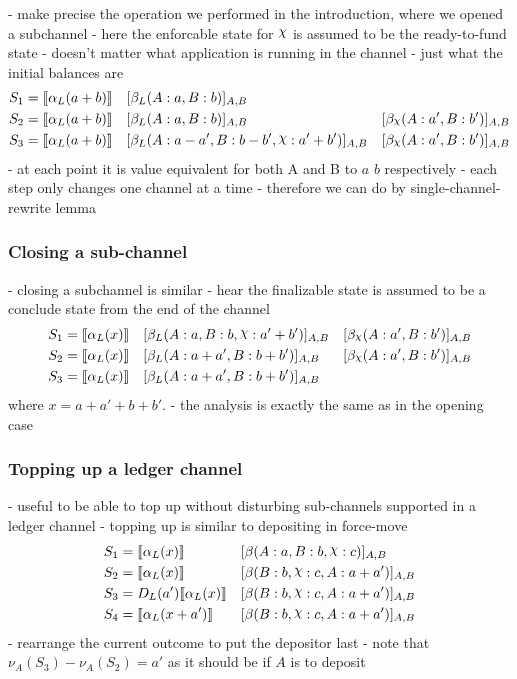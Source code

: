 \documentclass{article}
\DeclareRobustCommand{\rchi}{{\mathpalette\irchi\relax}}
\newcommand{\irchi}[2]{\raisebox{\depth}{$#1\chi$}} %
\theoremstyle{definition}
\newcommand{\adj}[1]{\llbracket #1 \rrbracket}
\newcommand{\enf}[1]{[#1]}
\begin{document}
- make precise the operation we performed in the introduction, where we opened a subchannel
- here the enforcable state for $\rchi$ is assumed to be the ready-to-fund state
- doesn't matter what application is running in the channel - just what the initial balances are
\begin{align*}
  S_1 &= \adj{\alpha_L(a+b)} &&\enf{\beta_L(A: a, B: b)}_{A, B} & \\
  S_2 &= \adj{\alpha_L(a+b)} &&\enf{\beta_L(A: a, B: b)}_{A, B}&\enf{\beta_\rchi(A: a', B: b')}_{A, B} \\
  S_3 &= \adj{\alpha_L(a+b)} &&\enf{\beta_L(A: a-a', B: b-b', \rchi: a' + b')}_{A, B}&\enf{\beta_\rchi(A: a', B: b')}_{A, B}
\end{align*}
- at each point it is value equivalent for both A and B to $a$ $b$ respectively
- each step only changes one channel at a time 
- therefore we can do by single-channel-rewrite lemma

\subsubsection{Closing a sub-channel}

- closing a subchannel is similar
- hear the finalizable state is assumed to be a conclude state from the end of the channel
\begin{align*}
S_1 &= \adj{\alpha_L(x)} &&\enf{\beta_L(A: a, B: b, \rchi: a' + b')}_{A, B}&\enf{\beta_\rchi(A: a', B: b')}_{A, B}\\
S_2 &= \adj{\alpha_L(x)} &&\enf{\beta_L(A: a + a', B: b + b')}_{A, B}&\enf{\beta_\rchi(A: a', B: b')}_{A, B} \\
S_3 &= \adj{\alpha_L(x)} &&\enf{\beta_L(A: a + a', B: b + b')}_{A, B} & 
\end{align*}
where $x = a + a' + b + b'$.
- the analysis is exactly the same as in the opening case

\subsubsection{Topping up a ledger channel}

- useful to be able to top up without disturbing sub-channels supported in a ledger channel
- topping up is similar to depositing in force-move
\begin{align*}
S_1 &= \adj{\alpha_L(x)} &&\enf{\beta(A: a, B: b, \rchi: c)}_{A, B} \\
S_2 &= \adj{\alpha_L(x)} &&\enf{\beta(B: b, \rchi: c, A: a + a')}_{A, B} \\
S_3 &= D_L(a')\adj{\alpha_L(x)} &&\enf{\beta(B: b, \rchi: c, A: a + a')}_{A, B} \\
S_4 &= \adj{\alpha_L(x + a')} &&\enf{\beta(B: b, \rchi: c, A: a + a')}_{A, B}
\end{align*}
- rearrange the current outcome to put the depositor last
- note that $\nu_A(S_3) - \nu_A(S_2) = a'$ as it should be if $A$ is to deposit
\end{document}
